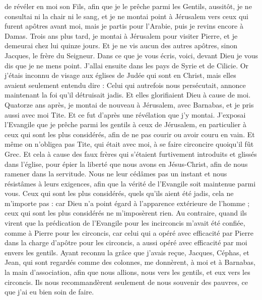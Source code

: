 \begin{multicols}{2}
de révéler en moi son Fils, afin que je le prêche parmi les Gentils, aussitôt, je ne consultai ni la chair ni le sang,
et je ne montai point à Jérusalem vers ceux qui furent apôtres avant moi, mais je partis pour l’Arabie, puis je revins encore à Damas.
Trois ans plus tard, je montai à Jérusalem pour visiter Pierre, et je demeurai chez lui quinze jours.
Et je ne vis aucun des autres apôtres, sinon Jacques, le frère du Seigneur.
Dans ce que je vous écris, voici, devant Dieu je vous dis que je ne mens point.
J'allai ensuite dans les pays de Syrie et de Cilicie.
Or j'étais inconnu de visage aux églises de Judée qui sont en Christ,
mais elles avaient seulement entendu dire : Celui qui autrefois nous persécutait, annonce maintenant la foi qu'il détruisait jadis.
Et elles glorifiaient Dieu à cause de moi.
\VerseOne{}Quatorze ans après, je montai de nouveau à Jérusalem, avec Barnabas, et je pris aussi avec moi Tite.
Et ce fut d’après une révélation que j'y montai. J’exposai l'Evangile que je prêche parmi les gentils à ceux de Jérusalem, en particulier à ceux qui sont les plus considérés, afin de ne pas courir ou avoir couru en vain.
Et même on n’obligea pas Tite, qui était avec moi, à se faire circoncire quoiqu’il fût Grec.
Et cela à cause des faux frères qui s’étaient furtivement introduits et glissés dans l'église, pour épier la liberté que nous avons en Jésus-Christ, afin de nous ramener dans la servitude.
Nous ne leur cédâmes pas un instant et nous résistâmes à leurs exigences, afin que la vérité de l'Evangile soit maintenue parmi vous.
Ceux qui sont les plus considérés, quels qu’ils aient été jadis, cela ne m’importe pas : car Dieu n’a point égard à l’apparence extérieure de l’homme ; ceux qui sont les plus considérés ne m’imposèrent rien.
Au contraire, quand ils virent que la prédication de l'Evangile pour les incirconcis m’avait été confiée, comme à Pierre pour les circoncis,
car celui qui a opéré avec efficacité par Pierre dans la charge d’apôtre pour les circoncis, a aussi opéré avec efficacité par moi envers les gentils.
Ayant reconnu la grâce que j'avais reçue, Jacques, Céphas, et Jean, qui sont regardés comme des colonnes, me donnèrent, à moi et à Barnabas, la main d'association, afin que nous allions, nous vers les gentils, et eux vers les circoncis.
Ils nous recommandèrent seulement de nous souvenir des pauvres, ce que j’ai eu bien soin de faire.

\end{multicols}
